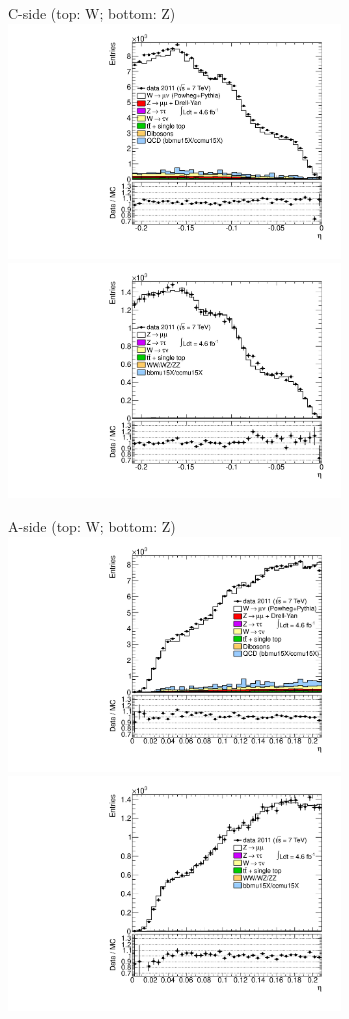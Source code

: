 {

\colb[T]

C-side (top: W; bottom: Z)
\centering
\includegraphics[width=0.66\textwidth]{dates/20130306/figures/etaphi/W_1_C_stack_l_eta_NEG} \\
\includegraphics[width=0.66\textwidth]{dates/20130306/figures/etaphi/Z_1_C_stack_lN_eta_ALL.pdf}

A-side (top: W; bottom: Z)
\centering
\includegraphics[width=0.66\textwidth]{dates/20130306/figures/etaphi/W_1_A_stack_l_eta_NEG} \\
\includegraphics[width=0.66\textwidth]{dates/20130306/figures/etaphi/Z_1_A_stack_lN_eta_ALL.pdf} 

\cole
}


